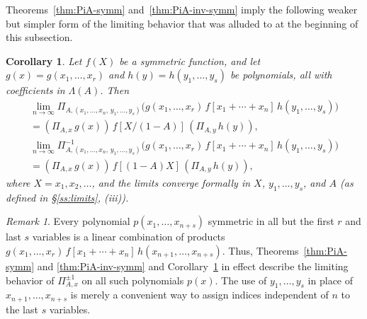 \documentclass[12pt]{amsart}
\newtheorem{cor}[thm]{Corollary}
\theoremstyle{definition}
\theoremstyle{remark}
\newtheorem{remark}[thm]{Remark}
\begin{document}
Theorems~\ref{thm:PiA-symm} and~\ref{thm:PiA-inv-symm} imply the
following weaker but simpler form of the limiting behavior that was
alluded to at the beginning of this subsection.

\begin{cor}\label{cor:other-limits}
Let $f(X)$ be a symmetric function, and let $g(x) =
g(x_{1},\ldots,x_{r})$ and $h(y) = h(y_{1},\ldots,y_{s})$ be
polynomials, all with coefficients in $\Lambda (A)$.  Then
\begin{multline}\label{e:other-limits-PiA}
\lim_{n\rightarrow \infty } \Pi _{A,(x_{1}, \ldots, x_{n},\,
y_{1},\ldots,y_{s})} \bigl(g(x_{1},\ldots,x_{r})\, f[x_{1}+\cdots
+x_{n}] \,
h(y_{1},\ldots,y_{s})\bigr) \\
= (\Pi _{A,x}\, g(x))\, f[X/(1-A)]\, (\Pi _{A,y}\, h(y)),
\end{multline}
\vspace{-3ex}
\begin{multline}\label{e:other-limits-PiA-inv}
\lim_{n\rightarrow \infty } \Pi _{A,(x_{1}, \ldots, x_{n},\,
y_{1},\ldots,y_{s})}^{-1} \bigl(g(x_{1},\ldots,x_{r})\, f[x_{1}+\cdots
+x_{n}] \,
h(y_{1},\ldots,y_{s})\bigr) \\
= (\Pi _{A,x}\, g(x))\, f[(1-A)X]\, (\Pi _{A,y}\, h(y)),
\end{multline}
where $X = x_{1}, x_{2}, \dots $, and the limits converge formally in
$X$, $y_{1},\ldots,y_{s}$, and $A$ (as defined in \S \ref{ss:limits},
(iii)).
\end{cor}

\begin{remark}\label{rem:other-limits}
Every polynomial $p(x_{1},\ldots,x_{n+s})$ symmetric in all but the
first $r$ and last $s$ variables is a linear combination of products
$g(x_{1},\ldots,x_{r})\, f[x_{1}+\cdots +x_{n}] \,
h(x_{n+1},\ldots,x_{n+s})$.  Thus, Theorems~\ref{thm:PiA-symm} and
\ref{thm:PiA-inv-symm} and Corollary~\ref{cor:other-limits} in effect
describe the limiting behavior of $\Pi _{A,x}^{\pm 1}$ on all such
polynomials $p(x)$.  The use of $y_{1},\ldots,y_{s}$ in place of
$x_{n+1},\ldots,x_{n+s}$ is merely a convenient way to assign indices
independent of $n$ to the last $s$ variables.
\end{remark}
\end{document}
